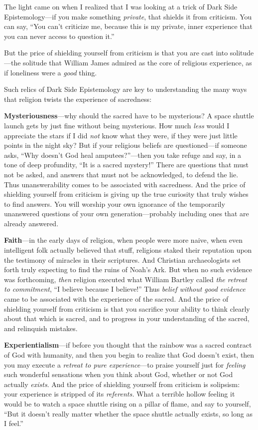 {
 The light came on when I realized that I was looking at a trick of
Dark Side Epistemology---if you make something \textit{private}, that
shields it from criticism. You can say, ``You
can't criticize me, because this is my private, inner
experience that you can never access to question
it.''}

{
 But the price of shielding yourself from criticism is that you are
cast into solitude---the solitude that William James admired as the
core of religious experience, as if loneliness were a \textit{good}
thing.}

{
 Such relics of Dark Side Epistemology are key to understanding the
many ways that religion twists the experience of sacredness:}

{
 \textbf{Mysteriousness}{}---why should the sacred have to be
mysterious? A space shuttle launch gets by just fine without being
mysterious. How much \textit{less} would I appreciate the stars if I
did \textit{not} know what they were, if they were just little points
in the night sky? But if your religious beliefs are questioned---if
someone asks, ``Why doesn't God heal
amputees?''---then you take refuge and say, in a tone
of deep profundity, ``It is a sacred
mystery!'' There are questions that must not be
asked, and answers that must not be acknowledged, to defend the lie.
Thus unanswerability comes to be associated with sacredness. And the
price of shielding yourself from criticism is giving up the true
curiosity that truly wishes to find answers. You will worship your own
ignorance of the temporarily unanswered questions of your own
generation---probably including ones that are already answered.}

{
 \textbf{Faith}{}---in the early days of religion, when people were
more naive, when even intelligent folk actually believed that stuff,
religions staked their reputation upon the testimony of miracles in
their scriptures. And Christian archaeologists set forth truly
expecting to find the ruins of Noah's Ark. But when no
such evidence was forthcoming, \textit{then} religion executed what
William Bartley called \textit{the retreat to commitment},
``I believe because I believe!''
Thus \textit{belief without good evidence} came to be associated with
the experience of the sacred. And the price of shielding yourself from
criticism is that you sacrifice your ability to think clearly about
that which is sacred, and to progress in your understanding of the
sacred, and relinquish mistakes.}

{
 \textbf{Experientialism}{}---if before you thought that the
rainbow was a sacred contract of God with humanity, and then you begin
to realize that God doesn't exist, then you may execute
a \textit{retreat to pure experience}{}---to praise yourself just for
\textit{feeling} such wonderful sensations when you think about God,
whether or not God actually \textit{exists}. And the price of shielding
yourself from criticism is solipsism: your experience is stripped of
its \textit{referents.} What a terrible hollow feeling it would be to
watch a space shuttle rising on a pillar of flame, and say to yourself,
``But it doesn't really matter whether
the space shuttle actually exists, so long as I
feel.''}

